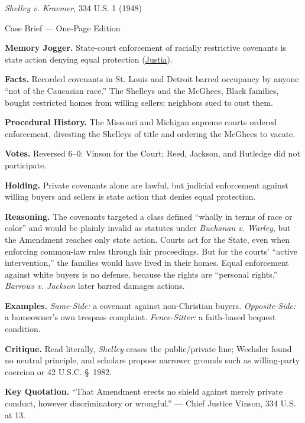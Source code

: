 \documentclass[12pt]{article}
\begin{document}
\begin{center}
{\Large \textit{Shelley v. Kraemer}, 334 U.S. 1 (1948)\par}
\vspace{0.3em}
{\normalsize Case Brief --- One-Page Edition\par}
\end{center}

\textbf{Memory Jogger.} State-court enforcement of racially restrictive covenants is state action denying equal protection (\href{https://supreme.justia.com/cases/federal/us/334/1/}{Justia}).

\textbf{Facts.} Recorded covenants in St. Louis and Detroit barred occupancy by anyone ``not of the Caucasian race.'' The Shelleys and the McGhees, Black families, bought restricted homes from willing sellers; neighbors sued to oust them.

\textbf{Procedural History.} The Missouri and Michigan supreme courts ordered enforcement, divesting the Shelleys of title and ordering the McGhees to vacate.

\textbf{Votes.} Reversed 6--0: Vinson for the Court; Reed, Jackson, and Rutledge did not participate.

\textbf{Holding.} Private covenants alone are lawful, but judicial enforcement against willing buyers and sellers is state action that denies equal protection.

\textbf{Reasoning.} The covenants targeted a class defined ``wholly in terms of race or color'' and would be plainly invalid as statutes under \textit{Buchanan v. Warley}, but the Amendment reaches only state action. Courts act for the State, even when enforcing common-law rules through fair proceedings. But for the courts' ``active intervention,'' the families would have lived in their homes. Equal enforcement against white buyers is no defense, because the rights are ``personal rights.'' \textit{Barrows v. Jackson} later barred damages actions.

\textbf{Examples.} \emph{Same-Side:} a covenant against non-Christian buyers. \emph{Opposite-Side:} a homeowner's own trespass complaint. \emph{Fence-Sitter:} a faith-based bequest condition.

\textbf{Critique.} Read literally, \textit{Shelley} erases the public/private line; Wechsler found no neutral principle, and scholars propose narrower grounds such as willing-party coercion or 42 U.S.C. \S~1982.

\textbf{Key Quotation.} ``That Amendment erects no shield against merely private conduct, however discriminatory or wrongful.'' --- Chief Justice Vinson, 334 U.S. at 13.
\end{document}
